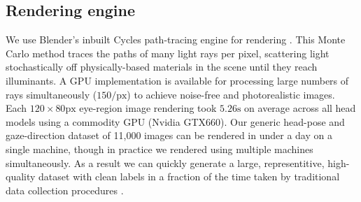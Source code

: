 \subsection{Rendering engine}

We use Blender's inbuilt Cycles path-tracing engine for rendering .
This Monte Carlo method traces the paths of many light rays per pixel, scattering light stochastically off physically-based materials in the scene until they reach illuminants.
A GPU implementation is available for processing large numbers of rays simultaneously ($150/\textrm{px}$) to achieve noise-free and photorealistic images.
Each $120\!\times\!80\textrm{px}$ eye-region image rendering took $5.26\textrm{s}$ on average across all head models using a commodity GPU (Nvidia GTX660).
Our generic head-pose and gaze-direction dataset of 11,000 images can be rendered in under a day on a single machine, though in practice we rendered using multiple machines simultaneously.
As a result we can quickly generate a large, representitive, high-quality dataset with clean labels in a fraction of the time taken by traditional data collection procedures \cite{zhang15_cvpr} .